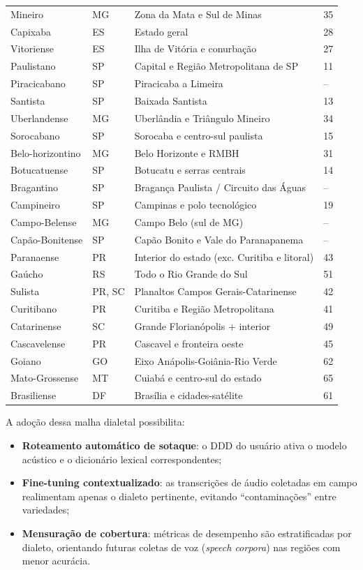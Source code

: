 \begin{table}[htbp]
\begin{tabular}{p{3.3cm} p{1.1cm} p{7.7cm} p{0.9cm}}
		Mineiro & MG & Zona da Mata e Sul de Minas & 35\\
		Capixaba & ES & Estado geral & 28\\
		Vitoriense & ES & Ilha de Vitória e conurbação & 27\\
		Paulistano & SP & Capital e Região Metropolitana de SP & 11\\
		Piracicabano & SP & Piracicaba a Limeira & --\\
		Santista & SP & Baixada Santista & 13\\
		Uberlandense & MG & Uberlândia e Triângulo Mineiro & 34\\
		Sorocabano & SP & Sorocaba e centro-sul paulista & 15\\
		Belo-horizontino & MG & Belo Horizonte e RMBH & 31\\
		Botucatuense & SP & Botucatu e serras centrais & 14\\
		Bragantino & SP & Bragança Paulista / Circuito das Águas & --\\
		Campineiro & SP & Campinas e polo tecnológico & 19\\
		Campo-Belense & MG & Campo Belo (sul de MG) & --\\
		Capão-Bonitense & SP & Capão Bonito e Vale do Paranapanema & --\\
		Paranaense & PR & Interior do estado (exc. Curitiba e litoral) & 43\\
		Gaúcho & RS & Todo o Rio Grande do Sul & 51\\
		Sulista & PR, SC & Planaltos Campos Gerais-Catarinense & 42\\
		Curitibano & PR & Curitiba e Região Metropolitana & 41\\
		Catarinense & SC & Grande Florianópolis + interior & 49\\
		Cascavelense & PR & Cascavel e fronteira oeste & 45\\
		Goiano & GO & Eixo Anápolis-Goiânia-Rio Verde & 62\\
		Mato-Grossense & MT & Cuiabá e centro-sul do estado & 65\\
		Brasiliense & DF & Brasília e cidades-satélite & 61\\
		\bottomrule
	\end{tabular}
\end{table}

A adoção dessa malha dialetal possibilita:

\begin{itemize}
	\item \textbf{Roteamento automático de sotaque}: o DDD do usuário ativa o
	modelo acústico e o dicionário lexical correspondentes;
	\item \textbf{Fine-tuning contextualizado}: as transcrições de áudio coletadas
	em campo realimentam apenas o dialeto pertinente, evitando
	“contaminações” entre variedades;
	\item \textbf{Mensuração de cobertura}: métricas de desempenho são
	estratificadas por dialeto, orientando futuras coletas de voz
	(\emph{speech corpora}) nas regiões com menor acurácia.
\end{itemize}

